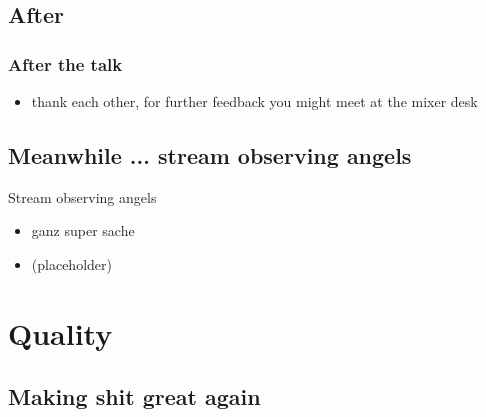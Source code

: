 \documentclass[hyperref={pdfpagelabels=false},aspectratio=169]{beamer}
\begin{document}



\subsection{After} %
\begin{frame}
\frametitle{After the talk}
\begin{itemize}
\item thank each other, for further feedback you might meet at the mixer desk
\end{itemize} 
\end{frame}


\subsection{Meanwhile ... stream observing angels} %
\begin{frame}{Stream observing angels}
\begin{itemize}
\item  ganz super sache
\item  (placeholder)
\end{itemize} 
\end{frame}

\section{Quality} 
\subsection{Making shit great again} 
\begin{frame}
\end{frame}
\end{document}
